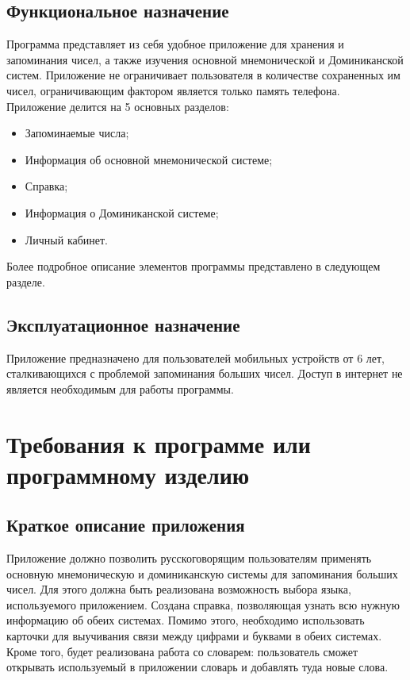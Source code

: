 \documentclass[draft]{article}
\begin{document}
\subsection{Функциональное назначение}
Программа представляет из себя удобное приложение для хранения и запоминания чисел, а также изучения основной мнемонической и Доминиканской систем. Приложение не ограничивает пользователя в количестве сохраненных им чисел, ограничивающим фактором является только память телефона.\\
Приложение делится на 5 основных разделов:
\begin{itemize}
\item Запоминаемые числа;\\
\item Информация об основной мнемонической системе;\\
\item Справка;\\
\item Информация о Доминиканской системе;\\
\item Личный кабинет.\\
\end{itemize}
Более подробное описание элементов программы представлено в следующем разделе.
\subsection{Эксплуатационное назначение}
Приложение предназначено для пользователей мобильных устройств от 6 лет, сталкивающихся с проблемой запоминания больших чисел. Доступ в интернет не является необходимым для работы программы.
~\\

\newpage
\section {Требования к программе или программному изделию}
\subsection{Краткое описание приложения}
Приложение должно позволить русскоговорящим пользователям применять основную мнемоническую и доминиканскую системы для запоминания больших чисел. Для этого должна быть реализована возможность выбора языка, используемого приложением. Создана справка, позволяющая узнать всю нужную информацию об обеих системах. Помимо этого, необходимо использовать карточки для выучивания связи между цифрами и буквами в обеих системах. Кроме того, будет реализована работа со словарем: пользователь сможет открывать используемый в приложении словарь и добавлять туда новые слова.
\end{document}
